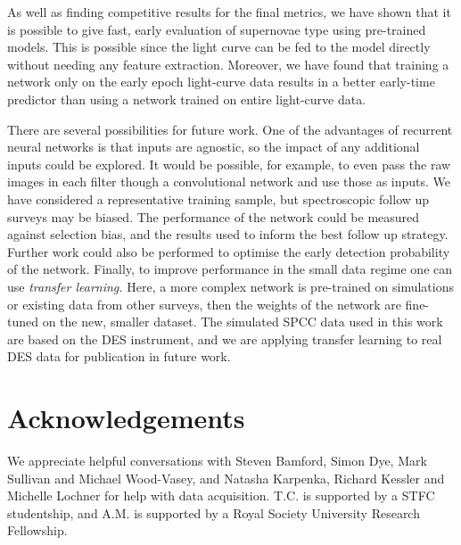 \documentclass[twocolumn]{aastex61}
\begin{document}
As well as finding competitive results for the final metrics, we have shown that it is possible to give fast, early evaluation of supernovae type using pre-trained models. This is possible since the light curve can be fed to the model directly without needing any feature extraction. Moreover, we have found that training a network only on the early epoch light-curve data results in a better early-time predictor than using a network trained on entire light-curve data. 

There are several possibilities for future work. One of the advantages of recurrent neural networks is that inputs are agnostic, so the impact of any additional inputs could be explored. It would be possible, for example, to even pass the raw images in each filter though a convolutional network and use those as inputs. We have considered a representative training sample, but spectroscopic follow up surveys may be biased. The performance of the network could be measured against selection bias, and the results used to inform the best follow up strategy.  Further work could also be performed to optimise the early detection probability of the network.  Finally, to improve performance in the small data regime one can use {\em transfer learning.} Here, a more complex network is pre-trained on simulations or existing data from other surveys, then the weights of the network are fine-tuned on the new, smaller dataset. The simulated SPCC data used in this work are based on the DES instrument, and we are applying transfer learning to real DES data for publication in future work. 

\section*{Acknowledgements}

We appreciate helpful conversations with Steven Bamford, Simon Dye, Mark Sullivan and Michael Wood-Vasey, and Natasha Karpenka, Richard Kessler and Michelle Lochner for help with data acquisition. T.C. is supported by a STFC studentship, and A.M. is supported by a Royal Society University Research Fellowship.
\end{document}
